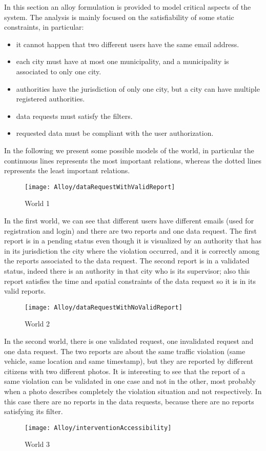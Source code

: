 In this section an alloy formulation is provided to model critical aspects of the system. The analysis is mainly focused on the satisfiability of some static constraints, in particular:
\begin{itemize}
	\item it cannot happen that two different users have the same email address.
	\item each city must have at most one municipality, and a municipality is associated to only one city.
	\item authorities have the jurisdiction of only one city, but a city can have multiple registered authorities.
	\item data requests must satisfy the filters.
	\item requested data must be compliant with the user authorization.
\end{itemize}

\vspace{10mm}


In the following we present some possible models of the world, in particular the continuous lines represents the most important relations, whereas the dotted lines represents the least important relations.
\begin{figure}[H]
	\centering
	\texttt{[image: Alloy/dataRequestWithValidReport]}
	\caption{World 1}
\end{figure}
In the first world, we can see that different users have different emails (used for registration and login) and there are two reports and one data request. The first report is in a pending status even though it is visualized by an authority that has in its jurisdiction the city where the violation occurred, and it is correctly among the reports associated to the data request. The second report is in a validated status, indeed there is an authority in that city who is its supervisor; also this report satisfies the time and spatial constraints of the data request so it is in its valid reports.
\begin{figure}[H]
	\centering
	\texttt{[image: Alloy/dataRequestWithNoValidReport]}
	\caption{World 2}
\end{figure}
In the second world, there is one validated request, one invalidated request and one data request. The two reports are about the same traffic violation (same vehicle, same location and same timestamp), but they are reported by different citizens with two different photos. It is interesting to see that the report of a same violation can be validated in one case and not in the other, most probably when a photo describes completely the violation situation and not respectively. In this case there are no reports in the data requests, because there are no reports satisfying its filter.
\begin{figure}[H]
	\centering
	\texttt{[image: Alloy/interventionAccessibility]}
	\caption{World 3}
\end{figure}

